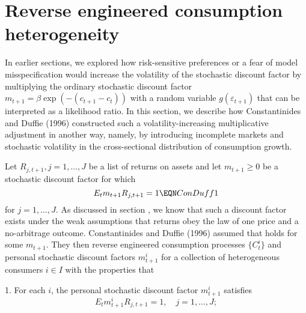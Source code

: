 %
%
%
%
%


\section{Reverse engineered consumption heterogeneity}\label{sec:ConsDuff}%
In earlier sections, we explored how risk-sensitive preferences or a fear of model misspecification would increase the volatility of the stochastic discount factor
by multiplying the ordinary stochastic discount factor
$
m_{t+1}= \beta \exp( - (c_{t+1} - c_t) ) $ with a random variable $  g(\varepsilon_{t+1})$ that can be interpreted as a likelihood ratio.
In this section, we describe how Constantinides and Duffie (1996) constructed such  a volatility-increasing  multiplicative adjustment in another way, namely,
by  introducing incomplete markets and stochastic volatility in the  cross-sectional distribution of consumption growth.

%
Let $R_{j, t+1}, j=1, \ldots, J$ be a list of returns on assets and let $m_{t+1}\geq 0$ be a stochastic discount factor
for which
$$ E_t m_{t+1}  R_{j,t+1} = 1 \EQN ConDuff1  $$
for $j = 1, \ldots, J$. As discussed  in section , we know that such a discount factor exists under the weak assumptions
that returns obey the law of one price and a no-arbitrage outcome.  Constantinides and Duffie (1996) assumed that   holds for some $m_{t+1}$.  They then reverse engineered consumption processes $\{C_t^i\}$ and  personal stochastic discount
factors $m^i_{t+1}$ for a  collection of heterogeneous consumers $i \in I$ with the properties
that
%
%
%
%
%
\medskip
\item{1.} For each $i$, the personal stochastic discount factor  $m_{t+1}^i$ satisfies
$$ E_t m_{t+1}^i R_{j,t+1} = 1 , \quad j =1, \ldots , J; $$

